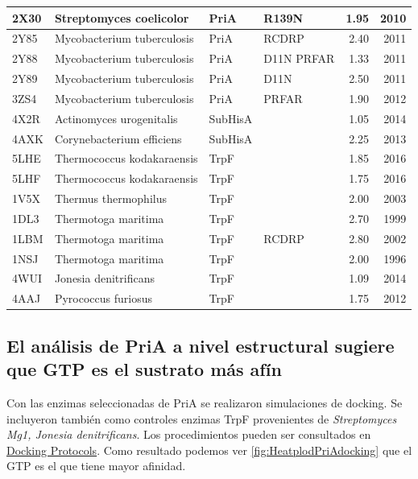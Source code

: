 \documentclass[12pt,twoside]{reedthesis}
\begin{document}
{\begin{table}[t]
{\begin{tabular}{l|l|l|l|r|r}
  \hline
  2X30 & Streptomyces coelicolor & PriA & R139N & 1.95 & 2010\\
  \hline
  2Y85 & Mycobacterium tuberculosis & PriA & RCDRP & 2.40 & 2011\\
  \hline
  2Y88 & Mycobacterium tuberculosis & PriA & D11N PRFAR & 1.33 & 2011\\
  \hline
  2Y89 & Mycobacterium tuberculosis & PriA & D11N & 2.50 & 2011\\
  \hline
  3ZS4 & Mycobacterium tuberculosis & PriA & PRFAR & 1.90 & 2012\\
  \hline
  4X2R & Actinomyces urogenitalis & SubHisA &  & 1.05 & 2014\\
  \hline
  4AXK & Corynebacterium efficiens & SubHisA &  & 2.25 & 2013\\
  \hline
  5LHE & Thermococcus kodakaraensis & TrpF &  & 1.85 & 2016\\
  \hline
  5LHF & Thermococcus kodakaraensis & TrpF &  & 1.75 & 2016\\
  \hline
  1V5X & Thermus thermophilus & TrpF &  & 2.00 & 2003\\
  \hline
  1DL3 & Thermotoga maritima & TrpF &  & 2.70 & 1999\\
  \hline
  1LBM & Thermotoga maritima & TrpF & RCDRP & 2.80 & 2002\\
  \hline
  1NSJ & Thermotoga maritima & TrpF &  & 2.00 & 1996\\
  \hline
  4WUI & Jonesia denitrificans & TrpF &  & 1.09 & 2014\\
  \hline
  4AAJ & Pyrococcus furiosus & TrpF &  & 1.75 & 2012\\
  \hline
  \end{tabular}}
  \end{table}
  
  \subsection{El análisis de PriA a nivel estructural sugiere que GTP es
  el sustrato más
  afín}\label{el-analisis-de-pria-a-nivel-estructural-sugiere-que-gtp-es-el-sustrato-mas-afin}
  
  Con las enzimas seleccionadas de PriA se realizaron simulaciones de
  docking. Se incluyeron también como controles enzimas TrpF provenientes
  de \emph{Streptomyces Mg1, Jonesia denitrificans}. Los procedimientos
  pueden ser consultados en
  \href{https://github.com/tripplab/Docking/wiki}{Docking Protocols}. Como
  resultado podemos ver \autoref{fig:HeatplodPriAdocking} que el GTP es el
  que tiene mayor afinidad.
  
}
\end{document}
